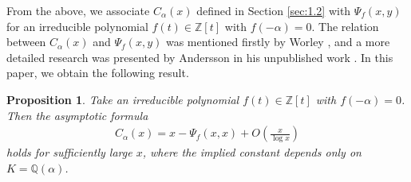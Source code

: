 \documentclass[a4paper,11pt]{amsart}
\newtheorem{proposition}[theorem]{Proposition}
\theoremstyle{definition}
\numberwithin{equation}{section}
\begin{document}
From the above, we associate $C_\alpha(x)$ defined in Section \ref{sec:1.2} with $\Psi_f(x,y)$ for an irreducible polynomial $f(t) \in \mathbb{Z}[t]$ with $f(-\alpha)=0$. 
The relation between $C_\alpha(x)$ and $\Psi_f(x,y)$ was mentioned firstly by Worley \cite{Worley1970}, and a more detailed research was presented by Andersson in his unpublished work \cite{Andersson2016+}. 
In this paper, we obtain the following result. 

\begin{proposition}\label{prop:5.4}
Take an irreducible polynomial $f(t) \in \mathbb{Z}[t]$ with $f(-\alpha)=0$. 
Then the asymptotic formula
\begin{align*}
C_\alpha(x)
= x-\Psi_f(x,x)
+ O\left(\frac{x}{\log{x}}\right) 
\end{align*}
holds for sufficiently large $x$, where the implied constant depends only on $K=\mathbb{Q}(\alpha)$. 
\end{proposition}
\end{document}
